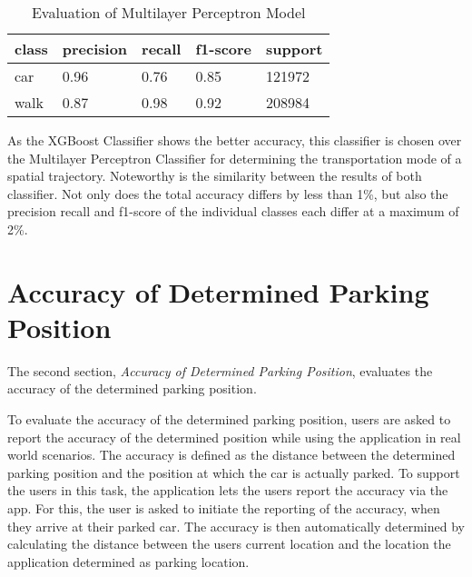 \begin{table}[h!]
    \centering
    \begin{tabular}{|l|l|l|l|l|} \toprule
        class & precision & recall & f1-score & support \\ \midrule
        car & 0.96 & 0.76 & 0.85 & 121972 \\
        walk & 0.87 & 0.98 & 0.92 & 208984 \\ \bottomrule 
    \end{tabular}
    \caption{Evaluation of Multilayer Perceptron Model}
    \label{table:mlp_eval}
\end{table}{}

As the XGBoost Classifier shows the better accuracy, this classifier is chosen over the Multilayer Perceptron Classifier for determining the transportation mode of a spatial trajectory. Noteworthy is the similarity between the results of both classifier. Not only does the total accuracy differs by less than 1\%, but also the precision recall and f1-score of the individual classes each differ at a maximum of 2\%.
     
\section{Accuracy of Determined Parking Position}
The second section, \textit{Accuracy of Determined Parking Position}, evaluates the accuracy of the determined parking position. 

To evaluate the accuracy of the determined parking position, users are asked to report the accuracy of the determined position while using the application in real world scenarios. The accuracy is defined as the distance between the determined parking position and the position at which the car is actually parked. To support the users in this task, the application lets the users report the accuracy via the app. For this, the user is asked to initiate the reporting of the accuracy, when they arrive at their parked car. The accuracy is then automatically determined by calculating the distance between the users current location and the location the application determined as parking location.


